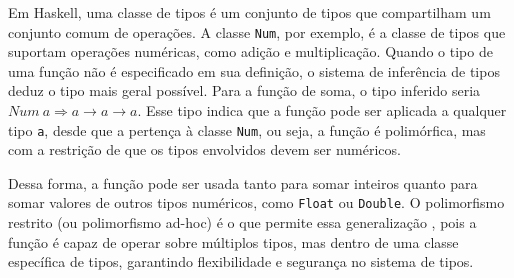 Em Haskell, uma classe de tipos é um conjunto de tipos que compartilham um conjunto comum de operações.
A classe \texttt{Num}, por exemplo, é a classe de tipos que suportam operações numéricas, como adição e multiplicação.
Quando o tipo de uma função não é especificado em sua definição, o sistema de inferência de tipos deduz o tipo mais geral possível.
Para a função de soma, o tipo inferido seria $Num\ a \Rightarrow a \rightarrow a \rightarrow a$.
Esse tipo indica que a função pode ser aplicada a qualquer tipo \texttt{a}, desde que a pertença à classe \texttt{Num}, ou seja, a função é polimórfica, mas com a restrição de que os tipos envolvidos devem ser numéricos.

Dessa forma, a função pode ser usada tanto para somar inteiros quanto para somar valores de outros tipos numéricos, como \texttt{Float} ou \texttt{Double}.
O polimorfismo restrito (ou polimorfismo ad-hoc) é o que permite essa generalização \cite{PIERCE2002}, pois a função é capaz de operar sobre múltiplos tipos, mas dentro de uma classe específica de tipos, garantindo flexibilidade e segurança no sistema de tipos.




